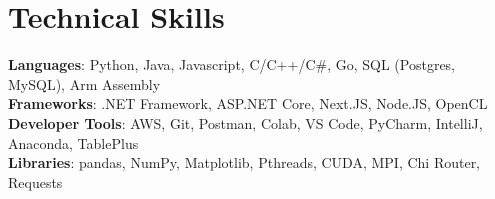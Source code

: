 \documentclass[letterpaper,11pt]{article}
\begin{document}
%
\section{Technical Skills}
 \begin{itemize}[leftmargin=0.15in, label={}]
    \small{\item{
     \textbf{Languages}{: Python, Java, Javascript, C/C++/C\#, Go, SQL (Postgres, MySQL), Arm Assembly} \\
     \textbf{Frameworks}{: .NET Framework, ASP.NET Core, Next.JS, Node.JS, OpenCL} \\
     \textbf{Developer Tools}{: AWS, Git, Postman, Colab, VS Code, PyCharm, IntelliJ, Anaconda, TablePlus} \\
     \textbf{Libraries}{: pandas, NumPy, Matplotlib, Pthreads, CUDA, MPI, Chi Router, Requests}
    }}
 \end{itemize}


\end{document}
